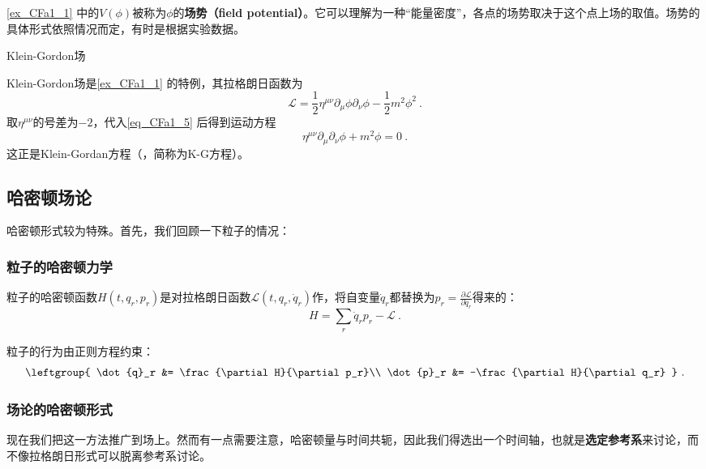 \autoref{ex_CFa1_1} 中的$V(\phi)$被称为$\phi$的\textbf{场势（field potential）}。它可以理解为一种“能量密度”，各点的场势取决于这个点上场的取值。场势的具体形式依照情况而定，有时是根据实验数据。



\begin{example}{Klein-Gordon场}

Klein-Gordon场是\autoref{ex_CFa1_1} 的特例，其拉格朗日函数为
\begin{equation}
\mathcal{L} = \frac{1}{2}\eta^{\mu\nu}\partial_\mu\phi\partial_\nu\phi - \frac{1}{2}m^2\phi^2~.
\end{equation}
取$\eta^{\mu\nu}$的号差为$-2$，代入\autoref{eq_CFa1_5} 后得到运动方程
\begin{equation}
\eta^{\mu\nu}\partial_\mu\partial_\nu\phi + m^2\phi = 0
 ~.
\end{equation}
这正是Klein-Gordan方程（，简称为K-G方程）。


\end{example}




\subsection{哈密顿场论}

哈密顿形式较为特殊。首先，我们回顾一下粒子的情况：

\subsubsection{粒子的哈密顿力学}

粒子的哈密顿函数$H(t, q_r, p_r)$是对拉格朗日函数$\mathcal{L}(t, q_r, \dot{q}_r)$作，将自变量$\dot{q}_r$都替换为$p_r=\frac{\partial \mathcal{L}}{\partial \dot{q}_r}$得来的：
\begin{equation}
H = \sum_r \dot{q}_rp_r-\mathcal{L}~.
\end{equation}

粒子的行为由正则方程约束：
\begin{equation}
\leftgroup{
    \dot{q}_r &= \frac{\partial H}{\partial p_r}\\
    \dot{p}_r &= -\frac{\partial H}{\partial q_r}
}~.
\end{equation}



\subsubsection{场论的哈密顿形式}


现在我们把这一方法推广到场上。然而有一点需要注意，哈密顿量与时间共轭，因此我们得选出一个时间轴，也就是\textbf{选定参考系}来讨论，而不像拉格朗日形式可以脱离参考系讨论。




















